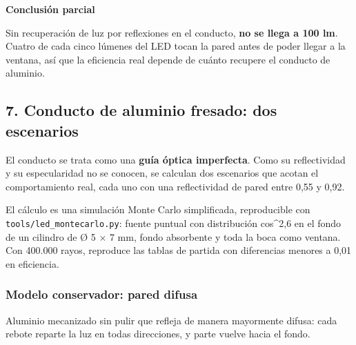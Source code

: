 \documentclass[11pt,a4paper]{article}
\newenvironment{notaclave}[1]
  {\begin{notaclavebase}{\sffamily\scriptsize\bfseries\color{amber}#1}\par\vspace{2pt}}
  {\end{notaclavebase}}
\begin{document}
\begin{notaclave}{Conclusión parcial}
Sin recuperación de luz por reflexiones en el conducto, \textbf{no se llega a 100 lm}. Cuatro de cada cinco lúmenes del LED tocan la pared antes de poder llegar a la ventana, así que la eficiencia real depende de cuánto recupere el conducto de aluminio.

\end{notaclave}

\subsection*{7. Conducto de aluminio fresado: dos escenarios}

El conducto se trata como una \textbf{guía óptica imperfecta}. Como su reflectividad y su especularidad no se conocen, se calculan dos escenarios que acotan el comportamiento real, cada uno con una reflectividad de pared entre 0,55 y 0,92.

El cálculo es una simulación Monte Carlo simplificada, reproducible con \texttt{tools/led\_montecarlo.py}: fuente puntual con distribución cos\textasciicircum{}2,6 en el fondo de un cilindro de Ø 5 $\times$ 7 mm, fondo absorbente y toda la boca como ventana. Con 400.000 rayos, reproduce las tablas de partida con diferencias menores a 0,01 en eficiencia.


\subsubsection*{Modelo conservador: pared difusa}

Aluminio mecanizado sin pulir que refleja de manera mayormente difusa: cada rebote reparte la luz en todas direcciones, y parte vuelve hacia el fondo.
\end{document}
